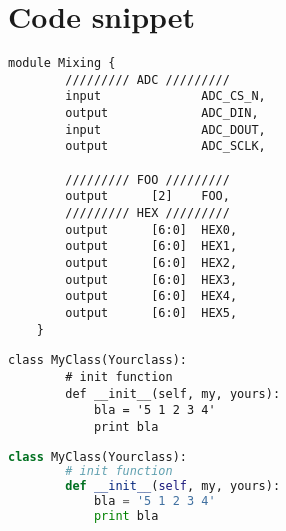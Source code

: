 \documentclass[12pt]{article}
\begin{document}
\section{Code snippet}
    \begin{lstlisting}[style={verilog-style},caption={verilog code snippet}]
    module Mixing {
        ///////// ADC /////////
        input              ADC_CS_N,
        output             ADC_DIN,
        input              ADC_DOUT,
        output             ADC_SCLK,

        ///////// FOO /////////
        output      [2]    FOO,
        ///////// HEX /////////
        output      [6:0]  HEX0,
        output      [6:0]  HEX1,
        output      [6:0]  HEX2,
        output      [6:0]  HEX3,
        output      [6:0]  HEX4,
        output      [6:0]  HEX5,
    }
    \end{lstlisting}
    \begin{lstlisting}[style={python-style},caption={python style}]
    class MyClass(Yourclass):
        # init function
        def __init__(self, my, yours):
            bla = '5 1 2 3 4'
            print bla
    \end{lstlisting}
    \begin{lstlisting}[language=Python,caption={default Settings}]
    class MyClass(Yourclass):
        # init function
        def __init__(self, my, yours):
            bla = '5 1 2 3 4'
            print bla
    \end{lstlisting}
\clearpage
\blinddocument
\makeendpage
\end{document}
